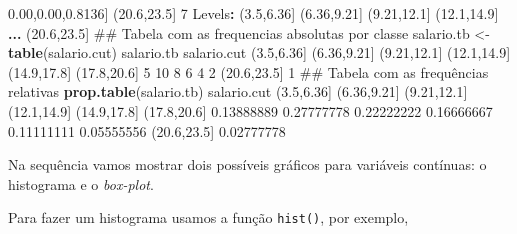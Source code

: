 \documentclass[10pt,a4paper]{book}
\newenvironment{Shaded}{\begin{snugshade}}{\end{snugshade}}
\newcommand{\KeywordTok}[1]{\textcolor[rgb]{0.13,0.29,0.53}{\textbf{#1}}}
\newcommand{\DecValTok}[1]{\textcolor[rgb]{0.00,0.00,0.81}{#1}}
\newcommand{\FloatTok}[1]{\textcolor[rgb]{0.00,0.00,0.81}{#1}}
\newcommand{\StringTok}[1]{\textcolor[rgb]{0.31,0.60,0.02}{#1}}
\newcommand{\OperatorTok}[1]{\textcolor[rgb]{0.81,0.36,0.00}{\textbf{#1}}}
\newcommand{\NormalTok}[1]{#1}
\begin{document}
\begin{Shaded}
\begin{Highlighting}[]
\NormalTok{[}\DecValTok{36}\NormalTok{] (}\FloatTok{20.6}\NormalTok{,}\FloatTok{23.5}\NormalTok{]}
\DecValTok{7}\NormalTok{ Levels}\OperatorTok{:}\StringTok{ }\NormalTok{(}\FloatTok{3.5}\NormalTok{,}\FloatTok{6.36}\NormalTok{] (}\FloatTok{6.36}\NormalTok{,}\FloatTok{9.21}\NormalTok{] (}\FloatTok{9.21}\NormalTok{,}\FloatTok{12.1}\NormalTok{] (}\FloatTok{12.1}\NormalTok{,}\FloatTok{14.9}\NormalTok{] }\KeywordTok{...}\NormalTok{ (}\FloatTok{20.6}\NormalTok{,}\FloatTok{23.5}\NormalTok{]}
\NormalTok{## Tabela com as frequencias absolutas por classe}
\NormalTok{salario.tb <-}\StringTok{ }\KeywordTok{table}\NormalTok{(salario.cut)}
\NormalTok{salario.tb}
\NormalTok{salario.cut}
\NormalTok{ (}\FloatTok{3.5}\NormalTok{,}\FloatTok{6.36}\NormalTok{] (}\FloatTok{6.36}\NormalTok{,}\FloatTok{9.21}\NormalTok{] (}\FloatTok{9.21}\NormalTok{,}\FloatTok{12.1}\NormalTok{] (}\FloatTok{12.1}\NormalTok{,}\FloatTok{14.9}\NormalTok{] (}\FloatTok{14.9}\NormalTok{,}\FloatTok{17.8}\NormalTok{] (}\FloatTok{17.8}\NormalTok{,}\FloatTok{20.6}\NormalTok{] }
          \DecValTok{5}          \DecValTok{10}           \DecValTok{8}           \DecValTok{6}           \DecValTok{4}           \DecValTok{2} 
\NormalTok{(}\FloatTok{20.6}\NormalTok{,}\FloatTok{23.5}\NormalTok{] }
          \DecValTok{1} 
\NormalTok{## Tabela com as frequências relativas}
\KeywordTok{prop.table}\NormalTok{(salario.tb)}
\NormalTok{salario.cut}
\NormalTok{ (}\FloatTok{3.5}\NormalTok{,}\FloatTok{6.36}\NormalTok{] (}\FloatTok{6.36}\NormalTok{,}\FloatTok{9.21}\NormalTok{] (}\FloatTok{9.21}\NormalTok{,}\FloatTok{12.1}\NormalTok{] (}\FloatTok{12.1}\NormalTok{,}\FloatTok{14.9}\NormalTok{] (}\FloatTok{14.9}\NormalTok{,}\FloatTok{17.8}\NormalTok{] (}\FloatTok{17.8}\NormalTok{,}\FloatTok{20.6}\NormalTok{] }
 \FloatTok{0.13888889}  \FloatTok{0.27777778}  \FloatTok{0.22222222}  \FloatTok{0.16666667}  \FloatTok{0.11111111}  \FloatTok{0.05555556} 
\NormalTok{(}\FloatTok{20.6}\NormalTok{,}\FloatTok{23.5}\NormalTok{] }
 \FloatTok{0.02777778} 
\end{Highlighting}
\end{Shaded}

Na sequência vamos mostrar dois possíveis gráficos para variáveis
contínuas: o histograma e o \emph{box-plot}.

Para fazer um histograma usamos a função \texttt{hist()}, por exemplo,

\begin{Shaded}
\end{Shaded}
\end{document}
